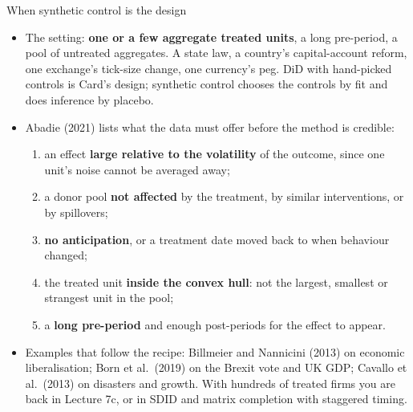 \documentclass[
  11pt,
  ignorenonframetext,
  aspectratio=169,
]{beamer}
\providecommand{\tightlist}{%
  \setlength{\itemsep}{0pt}\setlength{\parskip}{0pt}}
\begin{document}
\begin{frame}{When synthetic control is the design}
\protect{}\label{when-synthetic-control-is-the-design}
\begin{itemize}
\tightlist
\item
  The setting: \textbf{one or a few aggregate treated units}, a long
  pre-period, a pool of untreated aggregates. A state law, a country's
  capital-account reform, one exchange's tick-size change, one
  currency's peg. DiD with hand-picked controls is Card's design;
  synthetic control chooses the controls by fit and does inference by
  placebo.
\item
  Abadie (2021) lists what the data must offer before the method is
  credible:

  \begin{enumerate}
  \tightlist
  \item
    an effect \textbf{large relative to the volatility} of the outcome,
    since one unit's noise cannot be averaged away;
  \item
    a donor pool \textbf{not affected} by the treatment, by similar
    interventions, or by spillovers;
  \item
    \textbf{no anticipation}, or a treatment date moved back to when
    behaviour changed;
  \item
    the treated unit \textbf{inside the convex hull}: not the largest,
    smallest or strangest unit in the pool;
  \item
    a \textbf{long pre-period} and enough post-periods for the effect to
    appear.
  \end{enumerate}
\item
  Examples that follow the recipe: Billmeier and Nannicini (2013) on
  economic liberalisation; Born et al.~(2019) on the Brexit vote and UK
  GDP; Cavallo et al.~(2013) on disasters and growth. With hundreds of
  treated firms you are back in Lecture 7c, or in SDID and matrix
  completion with staggered timing.
\end{itemize}
\end{frame}
\end{document}
